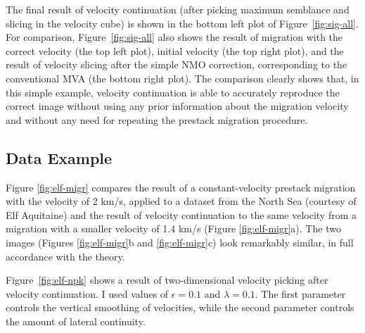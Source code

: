 The final result of velocity continuation (after picking maximum semblance and
slicing in the velocity cube) is shown in the bottom left plot of
Figure~\ref{fig:sig-all}. For comparison, Figure~\ref{fig:sig-all} also shows
the result of migration with the correct velocity (the top left plot), initial
velocity (the top right plot), and the result of velocity slicing after the
simple NMO correction, corresponding to the conventional MVA (the bottom right
plot). 
The comparison clearly shows that, in this simple example, velocity
continuation is able to accurately reproduce the correct image without using
any prior information about the migration velocity and without any need for
repeating the prestack migration procedure. 


\subsection{ Data Example}

Figure \ref{fig:elf-migr} compares the result of a constant-velocity prestack
migration with the velocity of 2 km/s, applied to a dataset from the North Sea
(courtesy of Elf Aquitaine) and the result of velocity continuation to the
same velocity from a migration with a smaller velocity of 1.4 km/s (Figure
\ref{fig:elf-migr}a). The two images (Figures \ref{fig:elf-migr}b and
\ref{fig:elf-migr}c) look remarkably similar, in full accordance with the
theory.


Figure~\ref{fig:elf-npk} shows a result of two-dimensional velocity
picking after velocity continuation. I used values of $\epsilon=0.1$
and $\lambda=0.1$. The first parameter controls the vertical smoothing
of velocities, while the second parameter controls the amount of
lateral continuity.


